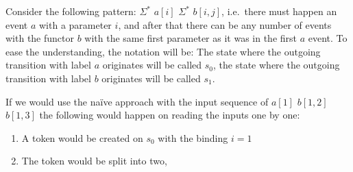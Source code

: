 	Consider the following pattern: $\Sigma^*$ $a[i]$ $\Sigma^*$ $b[i,j]$, i.e.~there must happen an event $a$ with a parameter $i$, and after that there can be any number of events with the functor $b$ with the same first parameter as it was in the first $a$ event. To ease the understanding, the notation will be: The state where the outgoing transition with label $a$ originates will be called $s_0$, the state where the outgoing transition with label $b$ originates will be called $s_1$.
	
	If we would use the na\"ive approach with the input sequence of $a[1]$ $b[1,2]$ $b[1,3]$ the following would happen on reading the inputs one by one:
	\begin{enumerate}
		\item A token would be created on $s_0$ with the binding $i=1$
		\item The token would be split into two, 
	\end{enumerate}

	
	